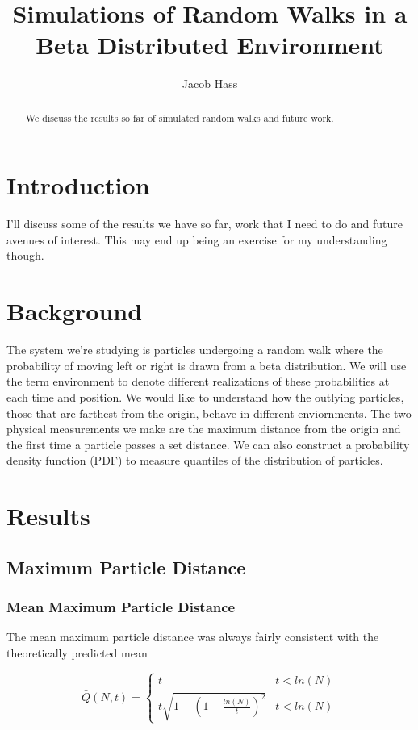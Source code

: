 \documentclass{article}
\title{Simulations of Random Walks in a Beta Distributed Environment}
\author{Jacob Hass}
\begin{document}
\maketitle

\begin{abstract} 
We discuss the results so far of simulated random walks and future work. 
\end{abstract}

\section{Introduction}
\indent\indent I'll discuss some of the results we have so far, work that I need to do and future avenues of interest. This may end up being an exercise for my understanding though. 

\section{Background} 
\indent\indent The system we're studying is particles undergoing a random walk where the probability of moving left or right is drawn from a beta distribution. We will use the term environment to denote different realizations of these probabilities at each time and position. We would like to understand how the outlying particles, those that are farthest from the origin, behave in different enviornments. The two physical measurements we make are the maximum distance from the origin and the first time a particle passes a set distance. We can also construct a probability density function (PDF) to measure quantiles of the distribution of particles. 

\section{Results} 
\subsection{Maximum Particle Distance}
\subsubsection{Mean Maximum Particle Distance}
 \indent\indent The mean maximum particle distance was always fairly consistent with the theoretically predicted mean 
 
 \begin{equation}
 \bar{Q}(N, t) = \begin{cases} t & t < ln(N) \\  t\sqrt{1 - (1-\frac{ln(N)}{t})^{2}} & t< ln(N) \end{cases} 
 \end{equation}
 
\end{document}
